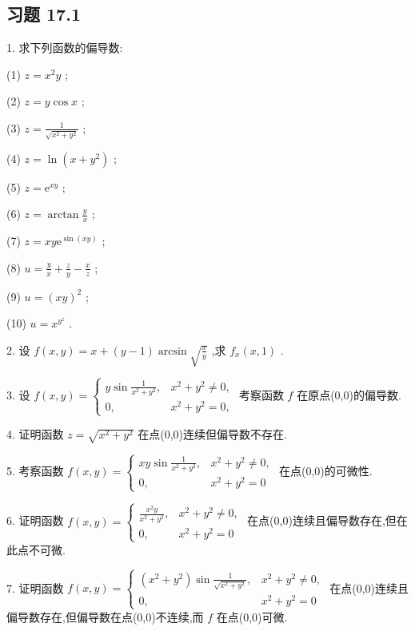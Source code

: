 \subsection{习题 17.1}

1. 求下列函数的偏导数:

(1) \(z = {x}^{2}y\) ;

(2) \(z = y\cos x\) ;

(3) \(z = \frac{1}{\sqrt{{x}^{2} + {y}^{2}}}\) ;

(4) \(z = \ln \left( {x + {y}^{2}}\right)\) ;

(5) \(z = {\mathrm{e}}^{xy}\) ;

(6) \(z = \arctan \frac{y}{x}\) ;

(7) \(z = {xy}{\mathrm{e}}^{\sin \left( {xy}\right) }\) ;

(8) \(u = \frac{y}{x} + \frac{z}{y} - \frac{x}{z}\) ;

(9) \(u = {\left( xy\right) }^{2}\) ;

(10) \(u = {x}^{{y}^{z}}\) .

2. 设 \(f\left( {x,y}\right)  = x + \left( {y - 1}\right) \arcsin \sqrt{\frac{x}{y}}\) ,求 \({f}_{x}\left( {x,1}\right)\) .

3. 设 \(f\left( {x,y}\right)  = \left\{  \begin{matrix} y\sin \frac{1}{{x}^{2} + {y}^{2}}, & {x}^{2} + {y}^{2} \neq  0, \\  0, & {x}^{2} + {y}^{2} = 0, \end{matrix}\right.\) 考察函数 \(f\) 在原点(0,0)的偏导数.

4. 证明函数 \(z = \sqrt{{x}^{2} + {y}^{2}}\) 在点(0,0)连续但偏导数不存在.

5. 考察函数 \(f\left( {x,y}\right)  = \left\{  \begin{matrix} {xy}\sin \frac{1}{{x}^{2} + {y}^{2}}, & {x}^{2} + {y}^{2} \neq  0, \\  0, & {x}^{2} + {y}^{2} = 0 \end{matrix}\right.\) 在点(0,0)的可微性.

6. 证明函数 \(f\left( {x,y}\right)  = \left\{  \begin{matrix} \frac{{x}^{2}y}{{x}^{2} + {y}^{2}}, & {x}^{2} + {y}^{2} \neq  0, \\  0, & {x}^{2} + {y}^{2} = 0 \end{matrix}\right.\) 在点(0,0)连续且偏导数存在,但在此点不可微.

7. 证明函数 \(f\left( {x,y}\right)  = \left\{  \begin{matrix} \left( {{x}^{2} + {y}^{2}}\right) \sin \frac{1}{\sqrt{{x}^{2} + {y}^{2}}}, & {x}^{2} + {y}^{2} \neq  0, \\  0, & {x}^{2} + {y}^{2} = 0 \end{matrix}\right.\) 在点(0,0)连续且偏导数存在,但偏导数在点(0,0)不连续,而 \(f\) 在点(0,0)可微.

